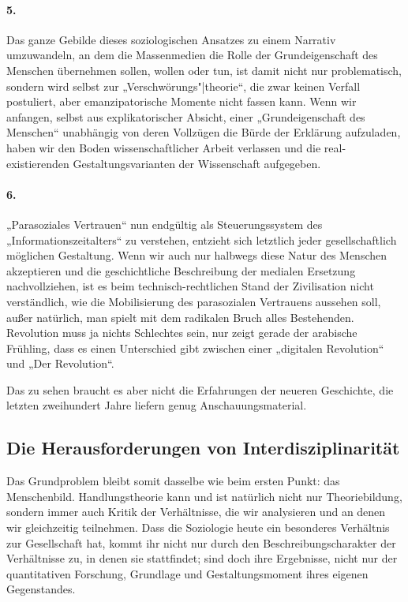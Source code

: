 \documentclass[a4paper,11pt]{article}
\begin{document}
\paragraph{5.} 
Das ganze Gebilde dieses soziologischen Ansatzes zu einem Narrativ umzuwandeln,
an dem die Massenmedien die Rolle der Grundeigenschaft des Menschen übernehmen
sollen, wollen oder tun, ist damit nicht nur problematisch, sondern wird selbst
zur „Verschwörungs"|theorie“, die zwar keinen Verfall postuliert, aber
emanzipatorische Momente nicht fassen kann. Wenn wir anfangen, selbst aus
explikatorischer Absicht, einer „Grundeigenschaft des Menschen“ unabhängig von
deren Vollzügen die Bürde der Erklärung aufzuladen, haben wir den Boden
wissenschaftlicher Arbeit verlassen und die real-existierenden
Gestaltungsvarianten der Wissenschaft aufgegeben.

\paragraph{6.} 
„Parasoziales Vertrauen“ nun endgültig als Steuerungssystem des
„Informationszeitalters“ zu verstehen, entzieht sich letztlich jeder
gesellschaftlich möglichen Gestaltung. Wenn wir auch nur halbwegs diese Natur
des Menschen akzeptieren und die geschichtliche Beschreibung der medialen
Ersetzung nachvollziehen, ist es beim technisch-rechtlichen Stand der
Zivilisation nicht verständlich, wie die Mobilisierung des parasozialen
Vertrauens aussehen soll, außer natürlich, man spielt mit dem radikalen Bruch
alles Bestehenden. Revolution muss ja nichts Schlechtes sein, nur zeigt gerade
der arabische Frühling, dass es einen Unterschied gibt zwischen einer
„digitalen Revolution“ und „Der Revolution“.  

Das zu sehen braucht es aber nicht die Erfahrungen der neueren Geschichte, die
letzten zweihundert Jahre liefern genug Anschauungsmaterial.

\subsection*{Die Herausforderungen von Interdisziplinarität}

Das Grundproblem bleibt somit dasselbe wie beim ersten Punkt: das Menschenbild.
Handlungstheorie kann und ist natürlich nicht nur Theoriebildung, sondern immer
auch Kritik der Verhältnisse, die wir analysieren und an denen wir gleichzeitig
teilnehmen. Dass die Soziologie heute ein besonderes Verhältnis zur
Gesellschaft hat, kommt ihr nicht nur durch den Beschreibungscharakter der
Verhältnisse zu, in denen sie stattfindet; sind doch ihre Ergebnisse, nicht nur
der quantitativen Forschung, Grundlage und Gestaltungsmoment ihres eigenen
Gegenstandes.
\end{document}
